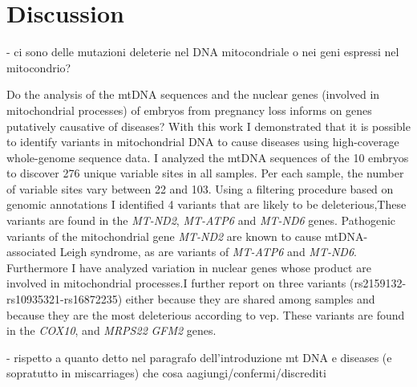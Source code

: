 \chapter{Discussion}
- ci sono delle mutazioni deleterie nel DNA mitocondriale o nei geni espressi nel mitocondrio?

Do the analysis of the mtDNA sequences and the nuclear genes (involved in mitochondrial processes) of embryos from pregnancy loss informs on genes putatively causative of diseases?
 With this work I demonstrated that it is possible to identify variants in mitochondrial DNA to cause diseases using high-coverage whole-genome sequence data.
 I analyzed the mtDNA sequences of the 10 embryos to discover 276 unique variable sites in all samples. Per each sample, the number of variable sites vary between 22 and 103. Using a filtering procedure  based on genomic annotations I identified 4 variants that are likely to be deleterious,These variants are found in the \textit {MT-ND2}, \textit{MT-ATP6} and \textit{MT-ND6} genes. 
Pathogenic variants of the mitochondrial gene \textit{MT-ND2} are known to cause mtDNA-associated Leigh syndrome, as are variants of \textit{MT-ATP6} and \textit{MT-ND6}. 
Furthermore I have analyzed variation in nuclear genes whose product are involved in mitochondrial processes.I further report on three variants (rs2159132-rs10935321-rs16872235) either because they are shared among samples and because they are the most deleterious according to vep. These variants are found in the \textit{COX10}, and \textit{MRPS22} \textit{GFM2} genes.




- rispetto  a quanto detto nel paragrafo dell'introduzione mt DNA e diseases (e sopratutto in miscarriages) che cosa aagiungi/confermi/discrediti 







